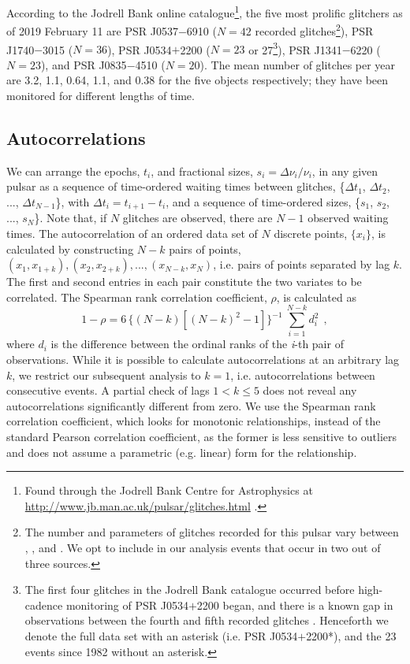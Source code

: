 According to the Jodrell Bank online catalogue\footnote{Found through the Jodrell Bank Centre for Astrophysics at \url{http://www.jb.man.ac.uk/pulsar/glitches.html} \citep{Espinoza2011}.}, the five most prolific glitchers as of 2019 February 11 are PSR J0537$-$6910 ($N=42$ recorded glitches\footnote[2]{The number and parameters of glitches recorded for this pulsar vary between \citet{Middleditch2006}, \citet{Ferdman2017}, and \citet{Antonopoulou2018}. We opt to include in our analysis events that occur in two out of three sources.}), PSR J1740$-$3015 ($N=36$), PSR J0534$+$2200 ($N=23$ or 27\footnote[3]{\label{foot:f3}The first four glitches in the Jodrell Bank catalogue occurred before high-cadence monitoring of PSR J0534$+$2200 began, and there is a known gap in observations between the fourth and fifth recorded glitches \citep{Lyne2015}. Henceforth we denote the full data set with an asterisk (i.e. PSR J0534$+$2200*), and the 23 events since 1982 without an asterisk.}), PSR J1341$-$6220 ($N=23$), and PSR J0835$-$4510 ($N=20$). The mean number of glitches per year are 3.2, 1.1, 0.64, 1.1, and 0.38 for the five objects respectively; they have been monitored for different lengths of time.

\subsection{Autocorrelations}
We can arrange the epochs, $t_i$, and fractional sizes, $s_i = \Delta \nu_i / \nu_i$, in any given pulsar as a sequence of time-ordered waiting times between glitches, \{$\Delta t_1$, $\Delta t_2$, ..., $\Delta t_{N-1}$\}, with $\Delta t_i = t_{i+1} - t_{i}$, and a sequence of time-ordered sizes, \{$s_1$, $s_2$, ..., $s_{N}$\}. Note that, if $N$ glitches are observed, there are $N-1$ observed waiting times. The autocorrelation of an ordered data set of $N$ discrete points, $\{x_i\}$, is calculated by constructing $N-k$ pairs of points, $(x_1, x_{1+k}), (x_2, x_{2+k}), ..., (x_{N-k}, x_N)$, i.e. pairs of points separated by lag $k$. The first and second entries in each pair constitute the two variates to be correlated. The Spearman rank correlation coefficient, $\rho$, is calculated as \citep{Lehmann2006}
\begin{equation}
\label{eq:acorr_spearman}
{1 - \rho = 6\, \bigg\{(N-k)\left[(N-k)^2 - 1\right] \bigg\}^{-1}\ \sum_{i=1}^{N-k} d_i^2} \ \ ,
\end{equation}
where $d_i$ is the difference between the ordinal ranks of the \emph{i}-th pair of observations. While it is possible to calculate autocorrelations at an arbitrary lag $k$, we restrict our subsequent analysis to $k=1$, i.e. autocorrelations between consecutive events. A partial check of lags $1 < k \leq 5$ does not reveal any autocorrelations significantly different from zero. We use the Spearman rank correlation coefficient, which looks for monotonic relationships, instead of the standard Pearson correlation coefficient, as the former is less sensitive to outliers and does not assume a parametric (e.g. linear) form for the relationship.

